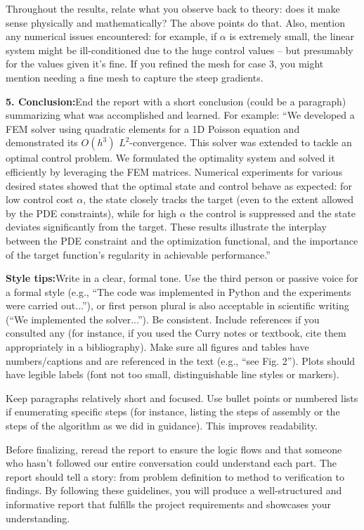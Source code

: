 \documentclass[a4paper,10pt]{report}
\begin{document}
Throughout the results, relate what you observe back to theory: does it make sense physically and mathematically? The above points do that. Also, mention any numerical issues encountered: for example, if \(\alpha\) is extremely small, the linear system might be ill-conditioned due to the huge control values – but presumably for the values given it's fine. If you refined the mesh for case 3, you might mention needing a fine mesh to capture the steep gradients.

\textbf{5. Conclusion:}End the report with a short conclusion (could be a paragraph) summarizing what was accomplished and learned. For example: “We developed a FEM solver using quadratic elements for a 1D Poisson equation and demonstrated its \(O(h^3)\) \(L^2\)-convergence. This solver was extended to tackle an optimal control problem. We formulated the optimality system and solved it efficiently by leveraging the FEM matrices. Numerical experiments for various desired states showed that the optimal state and control behave as expected: for low control cost \(\alpha\), the state closely tracks the target (even to the extent allowed by the PDE constraints), while for high \(\alpha\) the control is suppressed and the state deviates significantly from the target. These results illustrate the interplay between the PDE constraint and the optimization functional, and the importance of the target function's regularity in achievable performance.”

\textbf{Style tips:}Write in a clear, formal tone. Use the third person or passive voice for a formal style (e.g., “The code was implemented in Python and the experiments were carried out...”), or first person plural is also acceptable in scientific writing (“We implemented the solver...”). Be consistent. Include references if you consulted any (for instance, if you used the Curry notes or textbook, cite them appropriately in a bibliography). Make sure all figures and tables have numbers/captions and are referenced in the text (e.g., “see Fig. 2”). Plots should have legible labels (font not too small, distinguishable line styles or markers).

Keep paragraphs relatively short and focused. Use bullet points or numbered lists if enumerating specific steps (for instance, listing the steps of assembly or the steps of the algorithm as we did in guidance). This improves readability.

Before finalizing, reread the report to ensure the logic flows and that someone who hasn't followed our entire conversation could understand each part. The report should tell a story: from problem definition to method to verification to findings. By following these guidelines, you will produce a well-structured and informative report that fulfills the project requirements and showcases your understanding.
\end{document}
